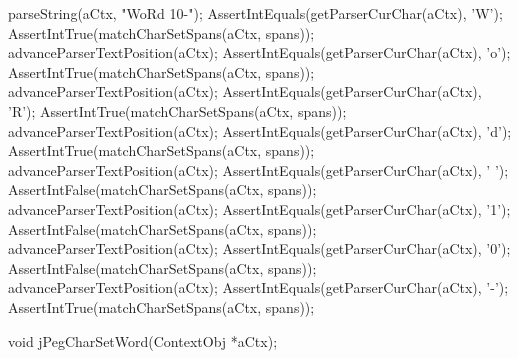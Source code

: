   parseString(aCtx, "WoRd 10-");
  AssertIntEquals(getParserCurChar(aCtx), 'W');
  AssertIntTrue(matchCharSetSpans(aCtx, spans));
  advanceParserTextPosition(aCtx);
  AssertIntEquals(getParserCurChar(aCtx), 'o');
  AssertIntTrue(matchCharSetSpans(aCtx, spans));
  advanceParserTextPosition(aCtx);
  AssertIntEquals(getParserCurChar(aCtx), 'R');
  AssertIntTrue(matchCharSetSpans(aCtx, spans));
  advanceParserTextPosition(aCtx);
  AssertIntEquals(getParserCurChar(aCtx), 'd');
  AssertIntTrue(matchCharSetSpans(aCtx, spans));
  advanceParserTextPosition(aCtx);
  AssertIntEquals(getParserCurChar(aCtx), ' ');
  AssertIntFalse(matchCharSetSpans(aCtx, spans));
  advanceParserTextPosition(aCtx);
  AssertIntEquals(getParserCurChar(aCtx), '1');
  AssertIntFalse(matchCharSetSpans(aCtx, spans));
  advanceParserTextPosition(aCtx);
  AssertIntEquals(getParserCurChar(aCtx), '0');
  AssertIntFalse(matchCharSetSpans(aCtx, spans));
  advanceParserTextPosition(aCtx);
  AssertIntEquals(getParserCurChar(aCtx), '-');
  AssertIntTrue(matchCharSetSpans(aCtx, spans));
\stopCTest
\stopTestCase
\stopTestSuite


\startCHeader
void jPegCharSetWord(ContextObj *aCtx);
\stopCHeader

